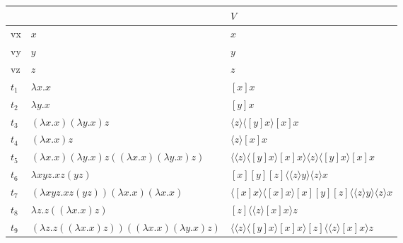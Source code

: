 \documentclass[11pt]{article}
\begin{document}
\begin{enumerate}
	      \color{red}
	      \begin{tabular}{|l|l|l|}
	      	\hline
	      	      &                               & $V$                                           \\
	      	\hline
	      	vx    & $x$                           & $x$                                           \\
	      	\hline
	      	vy    & $y$                           & $y$                                           \\
	      	\hline
	      	vz    & $z$                           & $z$                                           \\
	      	\hline
	      	$t_1$ & $\lambda x.x$                 & $[x]x$                                        \\
	      	\hline
	      	$t_2$ & $\lambda y.x$                 & $[y]x$                                        \\
	      	\hline
	      	$t_3$ & $(\lambda x.x)(\lambda y.x)z$ & $\langle z \rangle \langle [y]x \rangle [x]x$ \\
	      	\hline
	      	$t_4$ & $(\lambda x.x)z$              & $\langle z\rangle [x]x$                       \\
	      	\hline
	      	$t_5$ & $(\lambda x.x)(\lambda y.x) z ((\lambda x.x)(\lambda y.x)z)$          & $\langle \langle z \rangle \langle [y]x \rangle [x]x \rangle \langle z \rangle \langle [y]x \rangle [x]x$\\
	      	\hline
	      	$t_6$ & $\lambda xyz.xz(yz)$                             &  $[x][y][z]\langle \langle z \rangle y \rangle \langle z \rangle x$                                             \\
	      	\hline
	      	$t_7$ & $(\lambda xyz.xz(yz))(\lambda x.x)(\lambda x.x)$                             & $ \langle [x]x \rangle \langle [x]x \rangle [x][y][z]\langle \langle z \rangle y \rangle \langle z \rangle x $                                             \\
	      	\hline
	      	$t_8$ & $\lambda z. z((\lambda x.x)z) $                             & $[z] \langle \langle z \rangle [x]x \rangle z$                                             \\
	      	\hline
	      	$t_9$ & $(\lambda z. z((\lambda x.x)z))((\lambda x.x)(\lambda y.x)z) $                             & $\langle \langle z \rangle \langle [y]x \rangle [x]x\rangle [z] \langle \langle z \rangle [x]x \rangle z$                                             \\
	      	\hline
	      \end{tabular}
	            

\end{enumerate}
\end{document}
